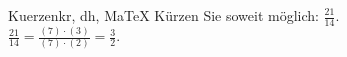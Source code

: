 \begin{MAufgabe}{Kuerzen}{kr, dh, MaTeX}
K\"urzen Sie soweit m\"oglich: $\frac{21}{14}$.\\ 
\ifLsg\MLoesung
\quad $\frac{21}{14}=\frac{(7)\cdot(3)}{(7)\cdot(2)}=\frac{3}{2}$.\else\relax\fi
 \end{MAufgabe}